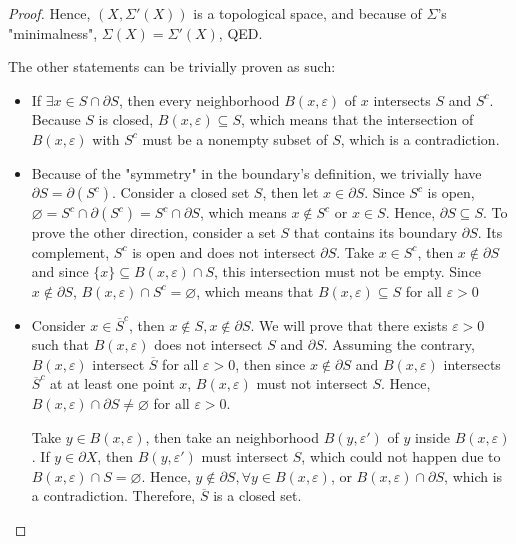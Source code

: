 \begin{proof}
Hence, \( (X, \Sigma'(X)) \) is a topological space, and because of \( \Sigma
\)'s "minimalness", \( \Sigma(X) = \Sigma'(X) \), QED.

The other statements can be trivially proven as such:

\begin{itemize}
  \item If \( \exists  x \in S \cap \partial S \), then every neighborhood
    \( B(x, \varepsilon) \) of \( x \) intersects \( S \) and \( S^{c} \).
    Because \( S \) is closed, \( B(x, \varepsilon) \subseteq  S \), which means
    that the intersection of \( B(x, \varepsilon) \) with \( S^{c} \) must be a
    nonempty subset of \( S \), which is a contradiction.
  \item Because of the "symmetry" in the boundary's definition, we trivially
    have \( \partial S = \partial (S^{c}) \). Consider a closed set \( S \),
    then let \( x \in \partial S \).
    Since \( S^{c} \) is open, \( \varnothing = S^{c} \cap \partial (S^{c}) =
    S^{c} \cap \partial S \), which means \( x \notin S^{c} \) or \( x \in S \).
    Hence, \( \partial S \subseteq S \). To prove the other direction, consider a
    set \( S \) that contains its boundary \( \partial S \). Its complement, \(
    S^{c}\) is open and does not intersect \( \partial S \). Take \( x \in
    S^{c} \), then \( x \notin \partial S \) and since \( \{x\}  \subseteq B(x,
    \varepsilon) \cap S   \), this intersection must not be empty. Since \( x
    \notin \partial S \), \( B(x, \varepsilon) \cap S^{c} = \varnothing \),
    which means that \( B(x, \varepsilon) \subseteq S
    \) for all \( \varepsilon > 0 \)
  \item Consider \( x \in \overline{S}^{c} \), then \( x \notin S, x \notin
    \partial S \). We will prove that there exists \( \varepsilon > 0 \) such
    that \( B(x, \varepsilon) \) does not intersect \( S \) and \( \partial S
    \). Assuming the contrary, \( B(x, \varepsilon) \) intersect \( \overline{S}
    \) for all \( \varepsilon > 0 \), then since \( x \notin \partial S \) and
    \( B(x, \varepsilon) \) intersects \( \overline{S}^{c} \) at at least one
    point \( x \), \( B(x, \varepsilon) \) must not intersect \( S \). Hence,
    \( B(x, \varepsilon) \cap \partial S \neq  \varnothing \) for all \(
    \varepsilon > 0 \).

    Take \( y \in B(x, \varepsilon) \), then take an neighborhood \( B(y,
    \varepsilon') \) of \( y \) inside \( B(x, \varepsilon) \). If \( y \in \partial
    X\), then \( B(y, \varepsilon') \) must intersect \( S \), which could not
    happen due to \( B(x, \varepsilon) \cap  S = \varnothing \). Hence, \( y
    \notin \partial S, \forall y \in B(x, \varepsilon) \), or \( B(x,
    \varepsilon) \cap  \partial S \), which is a contradiction. Therefore, \(
    \overline{S} \) is a closed set.


\end{itemize}
\end{proof}

